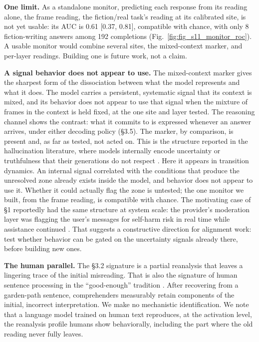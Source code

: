 \documentclass[11pt]{article}
\begin{document}
\textbf{One limit.} As a standalone monitor, predicting each response from its reading
alone, the frame reading, the fiction/real task's reading at its calibrated site, is
not yet usable: its AUC is 0.61 [0.37, 0.81], compatible with chance, with only 8 fiction-writing
answers among 192 completions (Fig.~\ref{fig:fig_s11_monitor_roc}). A usable monitor would
combine several sites, the mixed-context marker, and per-layer readings. Building one
is future work, not a claim.

\textbf{A signal behavior does not appear to use.} The mixed-context marker gives the
sharpest form of the dissociation between what the model represents and what it does.
The model carries a persistent, systematic signal that its context is mixed, and
its behavior does not appear to use that signal when the mixture of frames in the
context is held fixed, at the one site and layer tested. The reasoning channel shows the contrast: what it commits to is expressed whenever an answer arrives, under either decoding policy (\S3.5). The marker, by comparison, is present and, as far as tested, not acted
on. This is the structure reported
in the hallucination literature, where models internally encode uncertainty or
truthfulness that their generations do not respect \citep{azaria2023,orgad2025}. Here it appears in transition dynamics. An internal signal correlated
with the conditions that produce the unresolved zone already exists inside the model,
and behavior does not appear to use it. Whether it could actually flag the zone is
untested; the one monitor we built, from the frame reading, is compatible with
chance. The motivating case of \S1 reportedly had the same structure at system scale:
the provider's moderation layer was flagging the user's messages for self-harm risk
in real time while assistance continued \citep{raine2025complaint,cnn2025}. That suggests a
constructive direction for alignment work: test whether behavior can be gated on the
uncertainty signals already there, before building new ones.

\textbf{The human parallel.} The \S3.2 signature is a partial reanalysis that leaves a
lingering trace of the initial misreading. That is also the signature of human
sentence processing in the ``good-enough'' tradition \citep{ferreira2002,christianson2001}. After
recovering from a garden-path sentence, comprehenders measurably retain components of
the initial, incorrect interpretation. We make no mechanistic identification. We note
that a language model trained on human text reproduces, at the activation level, the
reanalysis profile humans show behaviorally, including the part where the old reading
never fully leaves.
\end{document}
